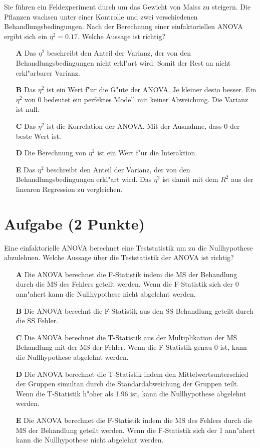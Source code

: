 \documentclass[a4paper, 9pt]{scrartcl}\usepackage[]{graphicx}\usepackage[]{xcolor}
\begin{document}
Sie f{\"u}hren ein Feldexperiment durch um das Gewicht von Maiss zu
steigern. Die Pflanzen wachsen unter einer Kontrolle und zwei verschiedenen
Behandlungsbedingungen. Nach der Berechnung einer einfaktoriellen ANOVA
ergibt sich ein $\eta^2 = 0.17$. Welche Aussage ist richtig?



\begin{enumerate}
\item [\textbf{A} \msquare] Das $\eta^2$ beschreibt den Anteil der Varianz, der von den Behandlungsbedingungen nicht erkl{"a}rt wird. Somit der Rest an nicht erkl{"a}rbarer Varianz.
\item [\textbf{B} \msquare] Das $\eta^2$ ist ein Wert f{"u}r die G{"u}te der ANOVA. Je kleiner desto besser. Ein $\eta^2$ von 0 bedeutet ein perfektes Modell mit keiner Abweichung. Die Varianz ist null.
\item [\textbf{C} \msquare] Das $\eta^2$ ist die Korrelation der ANOVA. Mit der Ausnahme, dass 0 der beste Wert ist.
\item [\textbf{D} \msquare] Die Berechnung von $\eta^2$ ist ein Wert f{"u}r die Interaktion.
\item [\textbf{E} \msquare] Das $\eta^2$ beschreibt den Anteil der Varianz, der von den Behandlungsbedingungen erkl{"a}rt wird. Das $\eta^2$ ist damit mit dem $R^2$ aus der linearen Regression zu vergleichen.
\end{enumerate} 

\section{Aufgabe \hfill (2 Punkte)}

Eine einfaktorielle ANOVA berechnet eine Teststatistik um zu die Nullhypothese abzulehnen. Welche Aussage {\"u}ber die Teststatistik der ANOVA ist richtig?



\begin{enumerate}
\item [\textbf{A} \msquare] Die ANOVA berechnet die F-Statistik indem die MS der Behandlung durch die MS des Fehlers geteilt werden. Wenn die F-Statistik sich der 0 ann{"a}hert kann die Nullhypothese nicht abgelehnt werden.
\item [\textbf{B} \msquare] Die ANOVA berechnt die F-Statistik aus den SS Behandlung geteilt durch die SS Fehler.
\item [\textbf{C} \msquare] Die ANOVA berechnet die T-Statistik aus der Multiplikation der MS Behandlung mit der MS der Fehler. Wenn die F-Statistik genau 0 ist, kann die Nullhypothese abgelehnt werden.
\item [\textbf{D} \msquare] Die ANOVA berechnet die T-Statistik indem den Mittelwertsunterschied der Gruppen simultan durch die Standardabweichung der Gruppen teilt. Wenn die T-Statistik h{"o}her als 1.96 ist, kann die Nullhypothese abgelehnt werden.
\item [\textbf{E} \msquare] Die ANOVA berechnet die F-Statistik indem die MS des Fehlers durch die MS der Behandlung geteilt werden. Wenn die F-Statistik sich der 1 ann{"a}hert kann die Nullhypothese nicht abgelehnt werden.
\end{enumerate} 
\end{document}
